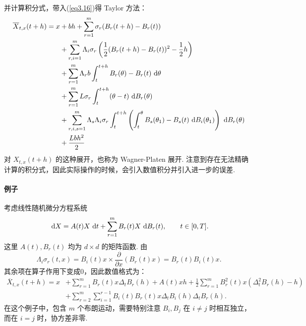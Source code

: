 并计算积分式，带入(\ref{eq3.16})得 Taylor 方法：
\begin{equation}\label{eq_taylor}
\begin{aligned}
\overline{X}_{t,x} (t+h) = x &+ bh+\sum_{r=1}^m \sigma_r(B_r(t+h)-B_r(t))\\
	&+\sum_{r,i=1}^m \Lambda_i\sigma_r \left( \frac12 (B_r(t+h) - B_r(t))^2 - \frac 12 h \right)\\
	&+\sum_{r=1}^m \Lambda_rb \int_t^{t+h} B_r(\theta)-B_r(t) \text{ d} \theta\\
	&+\sum_{r=1}^m L\sigma_r  \int_t^{t+h} (\theta - t)\text{ d} B_r(\theta)\\
	&+\sum_{r,i,s=1}^m \Lambda_s\Lambda_i\sigma_r \int_t^{t+h} \left(
	  \int_t^\theta B_s(\theta_1) - B_s(t) \text{ d} B_i(\theta_1)\right)\text{ d} B_r(\theta)\\
	&+\frac{Lbh^2}{2}
\end{aligned}
\end{equation}
对 $X_{t,x}(t+h)$ 的这种展开，也称为 Wagner-Platen 展开. 注意到存在无法精确计算的积分式，因此实际操作的时候，会引入数值积分并引入进一步的误差. 

\paragraph*{ 例子} 考虑线性随机微分方程系统
\begin{equation}\label{eq3.18}
	\text{ d} X = A(t) X \text{ d} t + \sum_{r=1}^m B_r(t) X\text{ d} B_r(t),\qquad  t\in [0,T].
\end{equation}
这里 $A(t),B_r(t)$ 均为 $d\times d$ 的矩阵函数. 由
\[
\Lambda_i\sigma_r(t,x) = B_i(t) x\times \frac{\partial}{\partial x} (B_r(t)x) = B_r(t)B_i(t)x.
\]
其余项在算子作用下变成0，因此数值格式为：
\[
\begin{aligned} 
	\overline{X}_{t,x}(t+h) =x&+\sum_{r=1}^m B_r(t) x \Delta_tB_r(h) + A(t)x h 
	+ \frac12\sum_{r=1}^m B_r^2(t) x (\Delta_t^2 B_r(h)-h)\\
	&+\sum_{r=2}^m\sum_{i=1}^{r-1} B_i(t)B_r(t) x \Delta_t B_i(h) \Delta_t B_r(h).
\end{aligned}
\]
在这个例子中，包含 $m$ 个布朗运动，需要特别注意 $B_i,B_j$ 在 $i\neq j$ 时相互独立，而在 $i=j$ 时，协方差非零. 


